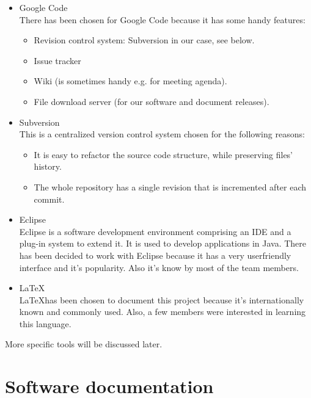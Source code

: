 \documentclass[a4paper, 12pt]{report}
\begin{document}
			\begin{itemize}
				
				\item Google Code \\
				There has been chosen for Google Code because it has some 
				handy features:
				
				\begin{itemize}
			 		\item Revision control system: Subversion in our case, see below.
					\item Issue tracker
					\item Wiki (is sometimes handy e.g. for meeting agenda).
					\item File download server (for our software and document releases).
				\end{itemize}

				\item Subversion \\
				This is a centralized version control system chosen for the 
				following reasons:
				
				\begin{itemize}
					\item It is easy to refactor the source code structure, 
					while preserving files' history.
					\item The whole repository has a single revision that is 
					incremented after each commit.
				\end{itemize}

				\item Eclipse \\
				Eclipse is a software development environment comprising an IDE and 
				a plug-in system to extend it. It is used to develop applications in 
				Java. There has been decided to work with Eclipse because 
				it has a very userfriendly interface and it's popularity. Also it's 
				know by most of the team members.
				
				\item \LaTeX \\
				 \LaTeX has been chosen to document this project because it's 
				internationally known and commonly used. Also, a few members 
				were interested in learning this language.
				
			\end{itemize}	
			
			More specific tools will be discussed later.
			
			\section{Software documentation}
			
\end{document}
